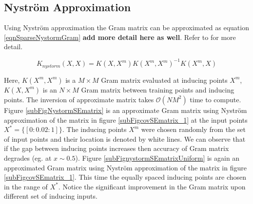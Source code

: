 \subsection{Nystr\"{o}m Approximation}\label{subSecNystrom} 

Using Nystr\"{o}m approximation the Gram matrix can be approximated as equation \ref{eqnSparseNystormGram} \textbf{add more detail here as well}. Refer to \cite{quinonero2005unifying, seeger2003fast} for more detail. 

\begin{equation}\label{eqnSparseNystormGram}
K_{nystorm}(X, X) = K(X, X^{m})K(X^{m}, X^{m})^{-1}K(X^{m}, X)
\end{equation}

Here, \(K(X^{m}, X^{m})\) is a \(M \times M\) Gram matrix evaluated at inducing points \(X^{m}\), \(K(X, X^{m})\) is an \(N \times M\) Gram matrix between training points and inducing points. The inversion of approximate matrix takes \(\mathcal{O}\left ( NM^{2} \right )\) time to compute. Figure \ref{subFigNystormSEmatrix} is an approximate Gram matrix using Nystr\"{o}m approximation of the matrix in figure \ref{subFigcovSEmatrix_1} at the input points \(X^{*} = \{[0:0.02:1]\}\). The inducing points \(X^{m}\) were chosen randomly from the set of input points and their location is denoted by white lines. We can observe that if the gap between inducing points increases then accuracy of Gram matrix degrades (eg. at \(x \sim 0.5\)). Figure \ref{subFignystormSEmatrixUniform} is again an approximated Gram matrix using Nystr\"{o}m approximation of the matrix in figure \ref{subFigcovSEmatrix_1}. This time the equally spaced inducing points are chosen in the range of \(X^{*}\). Notice the significant improvement in the Gram matrix upon different set of inducing inputs.

